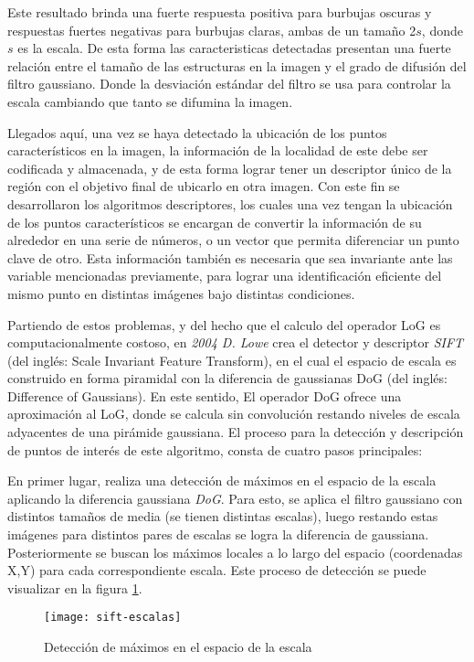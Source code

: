 Este resultado brinda una fuerte respuesta positiva para burbujas oscuras y respuestas fuertes negativas para burbujas claras, ambas de un tamaño 2$s$, donde $s$ es la escala. De esta forma las caracteristicas detectadas presentan una fuerte relación entre el tamaño de las estructuras en la imagen y el grado de difusión del filtro gaussiano. Donde la desviación estándar del filtro se usa para controlar la escala cambiando que tanto se difumina la imagen.

Llegados aquí, una vez se haya detectado la ubicación de los puntos característicos en la imagen, la información de la localidad de este debe ser codificada y almacenada, y de esta forma lograr tener un descriptor único de la región con el objetivo final de ubicarlo en otra imagen. Con este fin se desarrollaron los algoritmos descriptores, los cuales una vez tengan la ubicación de los puntos característicos se encargan de convertir la información de su alrededor en una serie de números, o un vector que permita diferenciar un punto clave de otro. Esta información también es necesaria que sea invariante ante las variable mencionadas previamente, para lograr una identificación eficiente del mismo punto en distintas imágenes bajo distintas condiciones.

Partiendo de estos problemas, y del hecho que el calculo del operador LoG es computacionalmente costoso, en \textit{2004 D. Lowe} crea el detector y descriptor \textit{SIFT} \cite{sift} (del inglés: Scale Invariant Feature Transform), en el cual el espacio de escala es construido en forma piramidal con la diferencia de gaussianas DoG (del inglés: Difference of Gaussians). En este sentido, El operador DoG ofrece una aproximación al LoG, donde se calcula sin convolución restando niveles de escala adyacentes de una pirámide gaussiana. El proceso para la detección y descripción de puntos de interés de este algoritmo, consta de cuatro pasos principales:

En primer lugar, realiza una detección de máximos en el espacio de la escala aplicando la diferencia gaussiana \textit{DoG}. Para esto, se aplica el filtro gaussiano con distintos tamaños de media (se tienen distintas escalas), luego restando estas imágenes para distintos pares de escalas se logra la diferencia de gaussiana. Posteriormente se buscan los máximos locales a lo largo del espacio (coordenadas X,Y) para cada correspondiente escala. Este proceso de detección se puede visualizar en la figura \ref{imagen:sift-escalas}.

\begin{figure}[H]
	\centering
	\texttt{[image: sift-escalas]}
	\caption[SIFT - Espacio de escalas]{Detección de máximos en el espacio de la escala}
	\label{imagen:sift-escalas}
\end{figure}


